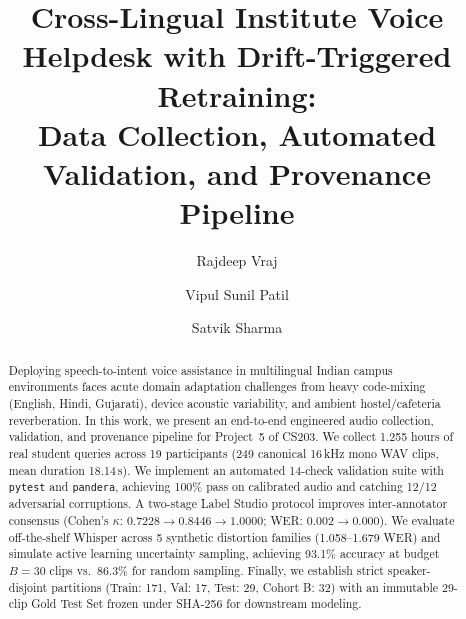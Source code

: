 \documentclass[sigconf,authordraft]{acmart}
\begin{document}
\title[Cross-Lingual Institute Voice Helpdesk Pipeline]{%
  Cross-Lingual Institute Voice Helpdesk with Drift-Triggered Retraining:\\
  Data Collection, Automated Validation, and Provenance Pipeline}

\author{Rajdeep Vraj}

\author{Vipul Sunil Patil}
\authornotemark[1]

\author{Satvik Sharma}
\authornotemark[1]

\renewcommand{\shortauthors}{Vraj, Patil, and Sharma}

\begin{abstract}
Deploying speech-to-intent voice assistance in multilingual Indian campus environments
faces acute domain adaptation challenges from heavy code-mixing (English, Hindi, Gujarati),
device acoustic variability, and ambient hostel/cafeteria reverberation. In this work,
we present an end-to-end engineered audio collection, validation, and provenance pipeline
for Project~5 of CS203. We collect 1.255 hours of real student queries across 19 participants
(249 canonical 16\,kHz mono WAV clips, mean duration 18.14\,s). We implement an automated
14-check validation suite with \texttt{pytest} and \texttt{pandera}, achieving 100\% pass
on calibrated audio and catching 12/12 adversarial corruptions. A two-stage Label Studio
protocol improves inter-annotator consensus (Cohen's $\kappa$: $0.7228 \rightarrow 0.8446 \rightarrow 1.0000$;
WER: $0.002 \rightarrow 0.000$). We evaluate off-the-shelf Whisper across 5 synthetic distortion
families (1.058--1.679 WER) and simulate active learning uncertainty sampling, achieving
93.1\% accuracy at budget $B = 30$ clips vs.\ 86.3\% for random sampling. Finally, we establish
strict speaker-disjoint partitions (Train: 171, Val: 17, Test: 29, Cohort B: 32) with an
immutable 29-clip Gold Test Set frozen under SHA-256 for downstream modeling.
\end{abstract}
\end{document}
